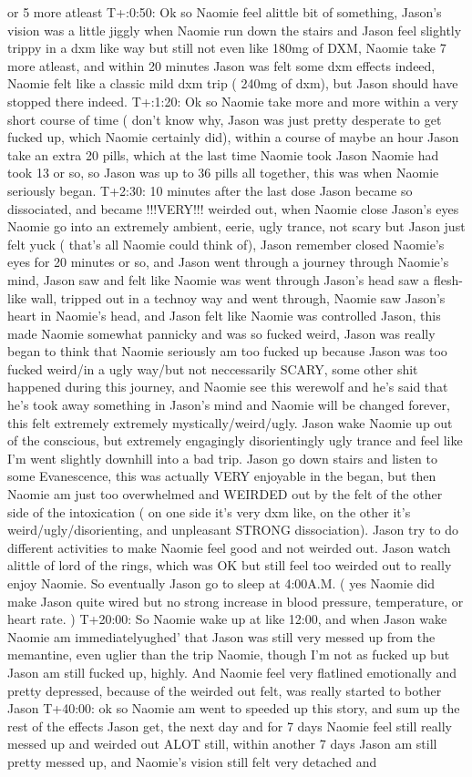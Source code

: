 \documentclass[12pt]{book}
\begin{document}
or 5 more atleast T+:0:50: Ok so Naomie feel alittle bit of something, Jason's vision was a little jiggly when Naomie run down the stairs and Jason feel slightly trippy in a dxm like way but still not even like 180mg of DXM, Naomie take 7 more atleast, and within 20 minutes Jason was felt some dxm effects indeed, Naomie felt like a classic mild dxm trip ( 240mg of dxm), but Jason should have stopped there indeed. T+:1:20: Ok so Naomie take more and more within a very short course of time ( don't know why, Jason was just pretty desperate to get fucked up, which Naomie certainly did), within a course of maybe an hour Jason take an extra 20 pills, which at the last time Naomie took Jason Naomie had took 13 or so, so Jason was up to 36 pills all together, this was when Naomie seriously began. T+2:30: 10 minutes after the last dose Jason became so dissociated, and became !!!VERY!!! weirded out, when Naomie close Jason's eyes Naomie go into an extremely ambient, eerie, ugly trance, not scary but Jason just felt yuck ( that's all Naomie could think of), Jason remember closed Naomie's eyes for 20 minutes or so, and Jason went through a journey through Naomie's mind, Jason saw and felt like Naomie was went through Jason's head saw a flesh-like wall, tripped out in a technoy way and went through, Naomie saw Jason's heart in Naomie's head, and Jason felt like Naomie was controlled Jason, this made Naomie somewhat pannicky and was so fucked weird, Jason was really began to think that Naomie seriously am too fucked up because Jason was too fucked weird/in a ugly way/but not neccessarily SCARY, some other shit happened during this journey, and Naomie see this werewolf and he's said that he's took away something in Jason's mind and Naomie will be changed forever, this felt extremely extremely mystically/weird/ugly. Jason wake Naomie up out of the conscious, but extremely engagingly disorientingly ugly trance and feel like I'm went slightly downhill into a bad trip. Jason go down stairs and listen to some Evanescence, this was actually VERY enjoyable in the began, but then Naomie am just too overwhelmed and WEIRDED out by the felt of the other side of the intoxication ( on one side it's very dxm like, on the other it's weird/ugly/disorienting, and unpleasant STRONG dissociation). Jason try to do different activities to make Naomie feel good and not weirded out. Jason watch alittle of lord of the rings, which was OK but still feel too weirded out to really enjoy Naomie. So eventually Jason go to sleep at 4:00A.M. ( yes Naomie did make Jason quite wired but no strong increase in blood pressure, temperature, or heart rate. ) T+20:00: So Naomie wake up at like 12:00, and when Jason wake Naomie am immediatelyughed' that Jason was still very messed up from the memantine, even uglier than the trip Naomie, though I'm not as fucked up but Jason am still fucked up, highly. And Naomie feel very flatlined emotionally and pretty depressed, because of the weirded out felt, was really started to bother Jason T+40:00: ok so Naomie am went to speeded up this story, and sum up the rest of the effects Jason get, the next day and for 7 days Naomie feel still really messed up and weirded out ALOT still, within another 7 days Jason am still pretty messed up, and Naomie's vision still felt very detached and 
\end{document}

